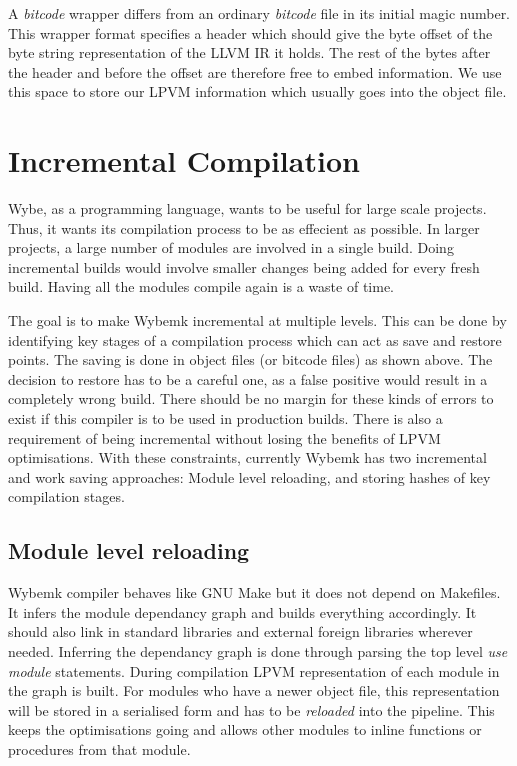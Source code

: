 A \textit{bitcode} wrapper differs from an ordinary \textit{bitcode} file in
its initial magic number. This wrapper format specifies a header which should
give the byte offset of the byte string representation of the LLVM IR it
holds. The rest of the bytes after the header and before the offset are
therefore free to embed information. We use this space to store our LPVM
information which usually goes into the object file.




\section{Incremental Compilation}

Wybe, as a programming language, wants to be useful for large scale
projects. Thus, it wants its compilation process to be as effecient as
possible. In larger projects, a large number of modules are involved in a
single build. Doing incremental builds would involve smaller changes being
added for every fresh build. Having all the modules compile again is a waste of
time. 

The goal is to make Wybemk incremental at multiple levels. This can be done by
identifying key stages of a compilation process which can act as save and
restore points. The saving is done in object files (or bitcode files) as shown
above. The decision to restore has to be a careful one, as a false positive
would result in a completely wrong build. There should be no margin for these
kinds of errors to exist if this compiler is to be used in production
builds. There is also a requirement of being incremental without losing the
benefits of LPVM optimisations. With these constraints, currently Wybemk has
two incremental and work saving approaches: Module level reloading, and storing
hashes of key compilation stages.


\subsection{Module level reloading}

Wybemk compiler behaves like GNU Make but it does not depend on Makefiles. It
infers the module dependancy graph and builds everything accordingly. It should
also link in standard libraries and external foreign libraries wherever
needed. Inferring the dependancy graph is done through parsing the top level
\textit{use module} statements. During compilation LPVM representation of each
module in the graph is built. For modules who have a newer object file, this
representation will be stored in a serialised form and has to be
\textit{reloaded} into the pipeline. This keeps the optimisations going and
allows other modules to inline functions or procedures from that module.

